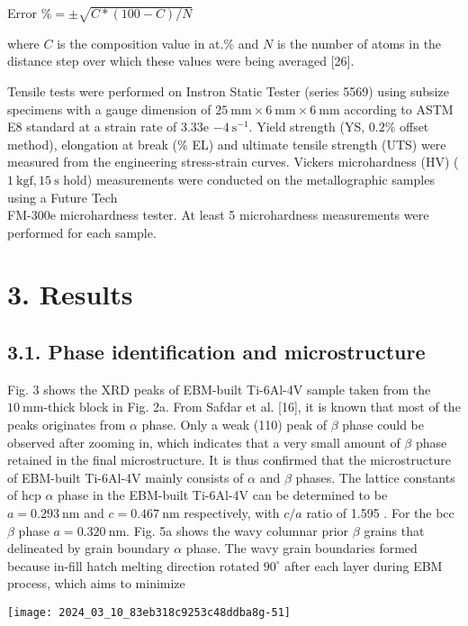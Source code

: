 \documentclass[10pt]{article}
\begin{document}
Error $\%= \pm \sqrt{C *(100-C) / N}$

where $C$ is the composition value in at.\% and $N$ is the number of atoms in the distance step over which these values were being averaged [26].

Tensile tests were performed on Instron Static Tester (series 5569) using subsize specimens with a gauge dimension of $25 \mathrm{~mm} \times 6 \mathrm{~mm} \times 6 \mathrm{~mm}$ according to ASTM E8 standard at a strain rate of 3.33e $-4 \mathrm{~s}^{-1}$. Yield strength (YS, $0.2 \%$ offset method), elongation at break (\% EL) and ultimate tensile strength (UTS) were measured from the engineering stress-strain curves. Vickers microhardness (HV) ( $1 \mathrm{~kg} \mathrm{f}, 15 \mathrm{~s}$ hold) measurements were conducted on the metallographic samples using a Future Tech\\
FM-300e microhardness tester. At least 5 microhardness measurements were performed for each sample.

\section*{3. Results}
\subsection*{3.1. Phase identification and microstructure}
Fig. 3 shows the XRD peaks of EBM-built Ti-6Al-4V sample taken from the $10 \mathrm{~mm}$-thick block in Fig. 2a. From Safdar et al. [16], it is known that most of the peaks originates from $\alpha$ phase. Only a weak (110) peak of $\beta$ phase could be observed after zooming in, which indicates that a very small amount of $\beta$ phase retained in the final microstructure. It is thus confirmed that the microstructure of EBM-built Ti-6Al-4V mainly consists of $\alpha$ and $\beta$ phases. The lattice constants of hcp $\alpha$ phase in the EBM-built Ti-6Al-4V can be determined to be $a=0.293 \mathrm{~nm}$ and $c=0.467 \mathrm{~nm}$ respectively, with $c / a$ ratio of 1.595 . For the bcc $\beta$ phase $a=0.320 \mathrm{~nm}$. Fig. 5a shows the wavy columnar prior $\beta$ grains that delineated by grain boundary $\alpha$ phase. The wavy grain boundaries formed because in-fill hatch melting direction rotated $90^{\circ}$ after each layer during EBM process, which aims to minimize

\begin{center}
\texttt{[image: 2024\_03\_10\_83eb318c9253c48ddba8g-51]}
\end{center}
\end{document}

